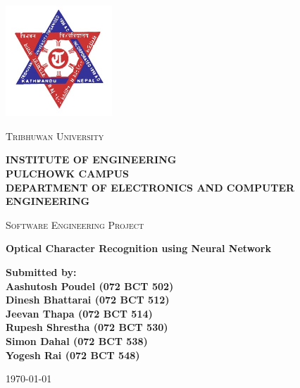 
\begin{titlepage}
	\centering
	\includegraphics[width=40mm]{tu}\par\vspace{1cm}
	{\scshape\LARGE Tribhuwan University \par}

	\textsc{\bfseries INSTITUTE OF ENGINEERING}\\
	\textsc{\bfseries PULCHOWK CAMPUS}\\
	\textsc{\bfseries DEPARTMENT OF ELECTRONICS AND COMPUTER ENGINEERING}\\

	\vspace{1cm}
	{\scshape\Large Software Engineering Project\par}
	\vspace{1.3cm}
	{\huge\bfseries Optical Character Recognition using Neural Network\par}
	\vspace{1.5cm}
	\bfseries
		{\Large Submitted by:\\}
		Aashutosh Poudel (072 BCT 502)\\
		Dinesh Bhattarai (072 BCT 512)\\
		Jeevan Thapa (072 BCT 514)\\
		Rupesh Shrestha (072 BCT 530)\\
		Simon Dahal (072 BCT 538)\\
		Yogesh Rai (072 BCT 548)\\
	\vspace{1.5cm}
	{\large \today\par}
\end{titlepage}

